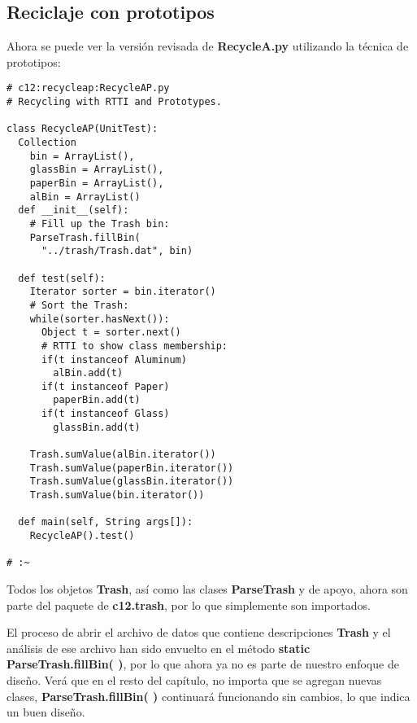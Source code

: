 \subsection*{Reciclaje con prototipos}
\label{subsec:rcp}


Ahora se puede ver la versión revisada de \textbf{RecycleA.py} utilizando la técnica de prototipos:     \newline

\begin{lstlisting} 
# c12:recycleap:RecycleAP.py  
# Recycling with RTTI and Prototypes. 

class RecycleAP(UnitTest): 
  Collection 
    bin = ArrayList(),  
    glassBin = ArrayList(), 
    paperBin = ArrayList(), 
    alBin = ArrayList() 
  def __init__(self): 
    # Fill up the Trash bin: 
    ParseTrash.fillBin( 
      "../trash/Trash.dat", bin) 
      
  def test(self): 
    Iterator sorter = bin.iterator() 
    # Sort the Trash: 
    while(sorter.hasNext()): 
      Object t = sorter.next() 
      # RTTI to show class membership: 
      if(t instanceof Aluminum) 
        alBin.add(t) 
      if(t instanceof Paper) 
        paperBin.add(t) 
      if(t instanceof Glass) 
        glassBin.add(t) 
        
    Trash.sumValue(alBin.iterator()) 
    Trash.sumValue(paperBin.iterator()) 
    Trash.sumValue(glassBin.iterator()) 
    Trash.sumValue(bin.iterator()) 
    
  def main(self, String args[]): 
    RecycleAP().test() 
    
# :~     
\end{lstlisting}

Todos los objetos \textbf{Trash}, así como las clases \textbf{ParseTrash} y de apoyo, ahora son parte del paquete de \textbf{c12.trash}, por lo que simplemente son importados.     \newline

El proceso de abrir el archivo de datos que contiene descripciones \textbf{Trash} y el análisis de ese archivo han sido envuelto en el método \textbf{static} \textbf{ParseTrash.fillBin( )}, por lo que ahora ya no es parte de nuestro enfoque de diseño. Verá que en el resto del capítulo, no importa que se agregan nuevas clases, \textbf{ParseTrash.fillBin( )} continuará funcionando sin cambios, lo que indica un buen diseño.   \newline

